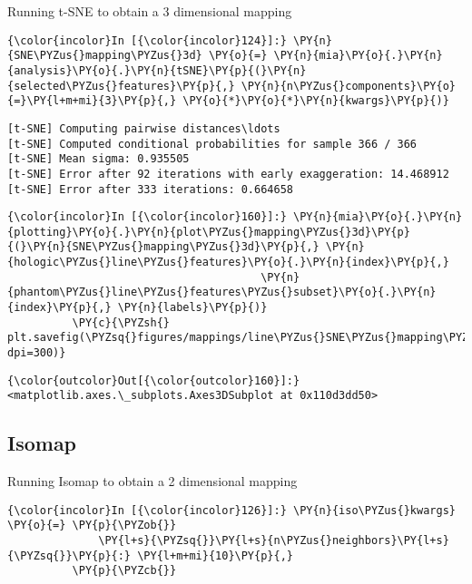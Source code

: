     Running t-SNE to obtain a 3 dimensional mapping

    \begin{Verbatim}[commandchars=\\\{\}]
{\color{incolor}In [{\color{incolor}124}]:} \PY{n}{SNE\PYZus{}mapping\PYZus{}3d} \PY{o}{=} \PY{n}{mia}\PY{o}{.}\PY{n}{analysis}\PY{o}{.}\PY{n}{tSNE}\PY{p}{(}\PY{n}{selected\PYZus{}features}\PY{p}{,} \PY{n}{n\PYZus{}components}\PY{o}{=}\PY{l+m+mi}{3}\PY{p}{,} \PY{o}{*}\PY{o}{*}\PY{n}{kwargs}\PY{p}{)}
\end{Verbatim}

    \begin{Verbatim}[commandchars=\\\{\}]
[t-SNE] Computing pairwise distances\ldots
[t-SNE] Computed conditional probabilities for sample 366 / 366
[t-SNE] Mean sigma: 0.935505
[t-SNE] Error after 92 iterations with early exaggeration: 14.468912
[t-SNE] Error after 333 iterations: 0.664658
    \end{Verbatim}

    \begin{Verbatim}[commandchars=\\\{\}]
{\color{incolor}In [{\color{incolor}160}]:} \PY{n}{mia}\PY{o}{.}\PY{n}{plotting}\PY{o}{.}\PY{n}{plot\PYZus{}mapping\PYZus{}3d}\PY{p}{(}\PY{n}{SNE\PYZus{}mapping\PYZus{}3d}\PY{p}{,} \PY{n}{hologic\PYZus{}line\PYZus{}features}\PY{o}{.}\PY{n}{index}\PY{p}{,}
                                       \PY{n}{phantom\PYZus{}line\PYZus{}features\PYZus{}subset}\PY{o}{.}\PY{n}{index}\PY{p}{,} \PY{n}{labels}\PY{p}{)}
          \PY{c}{\PYZsh{} plt.savefig(\PYZsq{}figures/mappings/line\PYZus{}SNE\PYZus{}mapping\PYZus{}3d.png\PYZsq{}, dpi=300)}
\end{Verbatim}

            \begin{Verbatim}[commandchars=\\\{\}]
{\color{outcolor}Out[{\color{outcolor}160}]:} <matplotlib.axes.\_subplots.Axes3DSubplot at 0x110d3dd50>
\end{Verbatim}

    \subsection{Isomap}\label{isomap}

Running Isomap to obtain a 2 dimensional mapping

    \begin{Verbatim}[commandchars=\\\{\}]
{\color{incolor}In [{\color{incolor}126}]:} \PY{n}{iso\PYZus{}kwargs} \PY{o}{=} \PY{p}{\PYZob{}}
              \PY{l+s}{\PYZsq{}}\PY{l+s}{n\PYZus{}neighbors}\PY{l+s}{\PYZsq{}}\PY{p}{:} \PY{l+m+mi}{10}\PY{p}{,}
          \PY{p}{\PYZcb{}}
\end{Verbatim}

